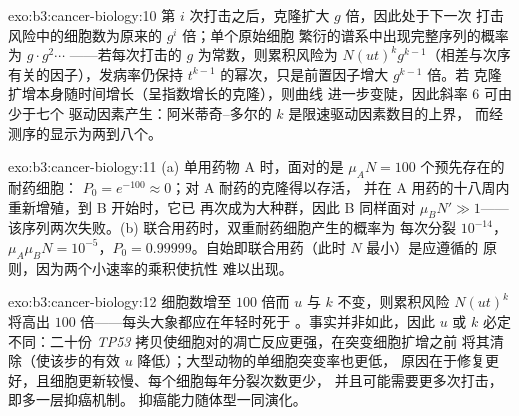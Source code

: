 \begin{solution}{exo:b3:cancer-biology:10}
第 $i$ 次打击之后，克隆扩大 $g$ 倍，因此处于下一次
打击风险中的细胞数为原来的 $g^{i}$ 倍；单个原始细胞
繁衍的谱系中出现完整序列的概率为 $g\cdot g^{2}\cdots$
——若每次打击的 $g$ 为常数，则累积风险为 $N(ut)^{k}
g^{k-1}$（相差与次序有关的因子），发病率仍保持
$t^{k-1}$ 的幂次，只是前置因子增大 $g^{k-1}$ 倍。若
克隆扩增本身随时间增长（呈指数增长的克隆），则曲线
进一步变陡，因此斜率 $6$ 可由少于七个
驱动因素产生：阿米蒂奇–多尔的 $k$ 是限速驱动因素数目的上界，
而经测序的显示为两到八个。
\end{solution}

\begin{solution}{exo:b3:cancer-biology:11}
(a) 单用药物 A 时，面对的是 $\mu_{A}N = 100$ 个预先存在的耐药细胞：
$P_{0} = e^{-100} \approx 0$；对 A 耐药的克隆得以存活，
并在 A 用药的十八周内重新增殖，到 B 开始时，它已
再次成为大种群，因此 B 同样面对 $\mu_{B}N' \gg 1$——
该序列两次失败。(b) 联合用药时，双重耐药细胞产生的概率为
每次分裂 $10^{-14}$，$\mu_{A}\mu_{B}N = 10^{-5}$，$P_{0} =
0.99999$。自始即联合用药（此时 $N$ 最小）是应遵循的
原则，因为两个小速率的乘积使抗性
难以出现。
\end{solution}

\begin{solution}{exo:b3:cancer-biology:12}
细胞数增至 $100$ 倍而 $u$ 与 $k$ 不变，则累积风险
$N(ut)^{k}$ 将高出 $100$ 倍——每头大象都应在年轻时死于
。事实并非如此，因此 $u$ 或 $k$ 必定不同：二十份
\emph{TP53} 拷贝使细胞对的凋亡反应更强，在突变细胞扩增之前
将其清除（使该步的有效 $u$ 降低）；大型动物的单细胞突变率也更低，
原因在于修复更好，且细胞更新较慢、每个细胞每年分裂次数更少，
并且可能需要更多次打击，
即多一层抑癌机制。
抑癌能力随体型一同演化。
\end{solution}


